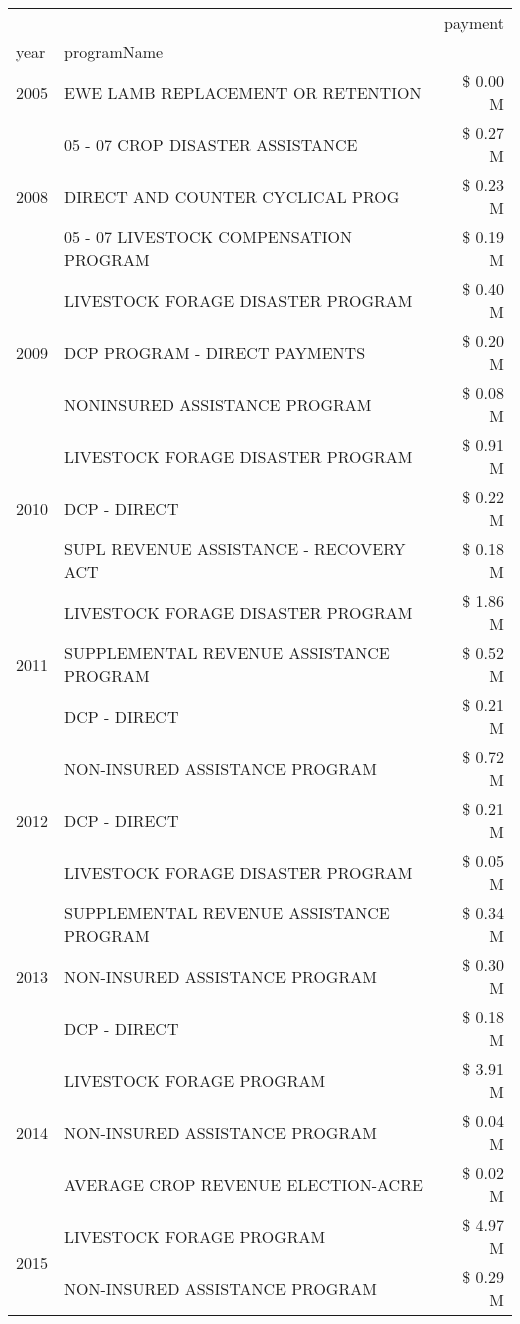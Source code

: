 \begin{tabular}{llr}
\toprule
 &  & payment \\
year & programName &  \\
\midrule
2005 & EWE LAMB REPLACEMENT OR RETENTION & \$ 0.00 M \\
\cline{1-3}
\multirow[t]{3}{*}{2008} & 05 - 07 CROP DISASTER ASSISTANCE & \$ 0.27 M \\
 & DIRECT AND COUNTER CYCLICAL PROG & \$ 0.23 M \\
 & 05 - 07 LIVESTOCK COMPENSATION PROGRAM & \$ 0.19 M \\
\cline{1-3}
\multirow[t]{3}{*}{2009} & LIVESTOCK FORAGE DISASTER  PROGRAM & \$ 0.40 M \\
 & DCP PROGRAM - DIRECT PAYMENTS & \$ 0.20 M \\
 & NONINSURED ASSISTANCE PROGRAM & \$ 0.08 M \\
\cline{1-3}
\multirow[t]{3}{*}{2010} & LIVESTOCK FORAGE DISASTER PROGRAM & \$ 0.91 M \\
 & DCP - DIRECT & \$ 0.22 M \\
 & SUPL REVENUE ASSISTANCE - RECOVERY ACT & \$ 0.18 M \\
\cline{1-3}
\multirow[t]{3}{*}{2011} & LIVESTOCK FORAGE DISASTER PROGRAM & \$ 1.86 M \\
 & SUPPLEMENTAL REVENUE ASSISTANCE PROGRAM & \$ 0.52 M \\
 & DCP - DIRECT & \$ 0.21 M \\
\cline{1-3}
\multirow[t]{3}{*}{2012} & NON-INSURED ASSISTANCE PROGRAM & \$ 0.72 M \\
 & DCP - DIRECT & \$ 0.21 M \\
 & LIVESTOCK FORAGE DISASTER PROGRAM & \$ 0.05 M \\
\cline{1-3}
\multirow[t]{3}{*}{2013} & SUPPLEMENTAL REVENUE ASSISTANCE PROGRAM & \$ 0.34 M \\
 & NON-INSURED ASSISTANCE PROGRAM & \$ 0.30 M \\
 & DCP - DIRECT & \$ 0.18 M \\
\cline{1-3}
\multirow[t]{3}{*}{2014} & LIVESTOCK FORAGE PROGRAM & \$ 3.91 M \\
 & NON-INSURED ASSISTANCE PROGRAM & \$ 0.04 M \\
 & AVERAGE CROP REVENUE ELECTION-ACRE & \$ 0.02 M \\
\cline{1-3}
\multirow[t]{3}{*}{2015} & LIVESTOCK FORAGE PROGRAM & \$ 4.97 M \\
 & NON-INSURED ASSISTANCE PROGRAM & \$ 0.29 M \\

\end{tabular}
